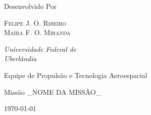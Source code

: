 \begin{titlepage}
\begin{minipage}[h!]{0.6\textwidth}
		Desenvolvido Por
	
		\vspace{0.5\baselineskip} %
	
		{\scshape\Large Felipe J. O. Ribeiro \\ Maíra F. O. Miranda \\} %
	
		\vspace{0.5\baselineskip} %
	
		\textit{Universidade Federal de \\ Uberlândia} %
	
		\vspace{14.8\baselineskip} %
	
		{\large Equipe de Propulsão e Tecnologia Aeroespacial} %
		
		\vspace{0.3\baselineskip} %
		
		Missão \_NOME DA MISSÂO\_ %
		
		\vspace{0.3\baselineskip} %
		
		\today %
		
	\end{minipage}

\end{titlepage}


